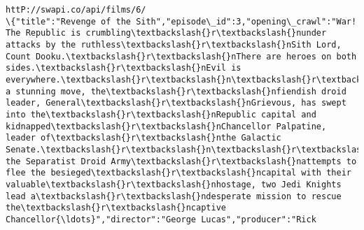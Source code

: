 \documentclass[11pt]{article}
\begin{document}
\begin{Verbatim}[commandchars=\\\{\}]
httP://swapi.co/api/films/6/
\{"title":"Revenge of the Sith","episode\_id":3,"opening\_crawl":"War! The Republic is crumbling\textbackslash{}r\textbackslash{}nunder attacks by the ruthless\textbackslash{}r\textbackslash{}nSith Lord, Count Dooku.\textbackslash{}r\textbackslash{}nThere are heroes on both sides.\textbackslash{}r\textbackslash{}nEvil is everywhere.\textbackslash{}r\textbackslash{}n\textbackslash{}r\textbackslash{}nIn a stunning move, the\textbackslash{}r\textbackslash{}nfiendish droid leader, General\textbackslash{}r\textbackslash{}nGrievous, has swept into the\textbackslash{}r\textbackslash{}nRepublic capital and kidnapped\textbackslash{}r\textbackslash{}nChancellor Palpatine, leader of\textbackslash{}r\textbackslash{}nthe Galactic Senate.\textbackslash{}r\textbackslash{}n\textbackslash{}r\textbackslash{}nAs the Separatist Droid Army\textbackslash{}r\textbackslash{}nattempts to flee the besieged\textbackslash{}r\textbackslash{}ncapital with their valuable\textbackslash{}r\textbackslash{}nhostage, two Jedi Knights lead a\textbackslash{}r\textbackslash{}ndesperate mission to rescue the\textbackslash{}r\textbackslash{}ncaptive Chancellor{\ldots}","director":"George Lucas","producer":"Rick 
\end{Verbatim}
\end{document}
